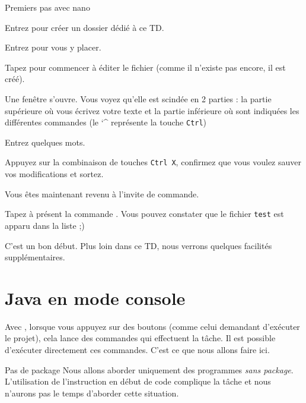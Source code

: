 \documentclass[a4paper,11pt]{style-esi/td}
\begin{document}
	\begin{Tutoriel}{Premiers pas avec nano}
	\vspace{-1em}
	\begin{steps}
	\item 
		Entrez  pour créer un dossier dédié à ce TD.
	\item 
		Entrez  pour vous y placer.
	\item 
		Tapez  pour commencer à éditer le fichier  
		(comme il n'existe pas encore, il est créé).
	
		Une fenêtre s'ouvre. 
		Vous voyez qu'elle est scindée en 2 parties : 
		la partie supérieure où vous écrivez votre texte 
		et la partie inférieure où sont indiquées 
		les différentes commandes (le \char`\^{} représente la touche \verb|Ctrl|)
	\item 
		Entrez quelques mots.
	\item 
		Appuyez sur la combinaison de touches \verb|Ctrl X|, 
		confirmez que vous voulez sauver vos modifications et sortez.
	
		Vous êtes maintenant revenu à l'invite de commande.
	\item 
		Tapez à présent la commande .
		Vous pouvez constater que le fichier \verb_test_ est apparu dans la liste ;)
	\end{steps}
	\end{Tutoriel}

	C'est un bon début.
	Plus loin dans ce TD, nous verrons quelques facilités 
	sup\-plé\-men\-tai\-res.

\section{Java en mode console}

	Avec , lorsque vous appuyez sur des boutons
	(comme celui demandant d'e\-xé\-cu\-ter le projet),
	cela lance des commandes qui effectuent la tâche.
	Il est possible d'exécuter directement ces commandes.
	C'est ce que nous allons faire ici.

	\bigskip
	\begin{alerttbox}{Pas de package}
		Nous allons aborder uniquement des programmes 
		\emph{sans package}.
		L'utilisation de l'instruction  en début de code
		complique la tâche et nous n'aurons pas le temps d'aborder cette situation.
	\end{alerttbox}
\end{document}
